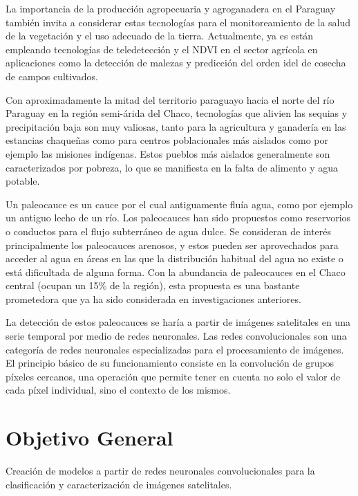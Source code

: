 \documentclass[a4paper, 11pt]{article}
\begin{document}
La importancia de la producción agropecuaria y agroganadera en el Paraguay también invita a considerar estas tecnologías para el monitoreamiento de la salud de la vegetación y el uso adecuado de la tierra. Actualmente, ya es están empleando tecnologías de teledetección y el NDVI en el sector agrícola en aplicaciones como la detección de malezas y predicción del orden idel de cosecha de campos cultivados. \autocite{onesoil-agricultura-paraguay}

Con aproximadamente la mitad del territorio paraguayo hacia el norte del río Paraguay en la región semi-árida del Chaco, tecnologías que alivien las sequias y precipitación baja son muy valiosas, tanto para la agricultura y ganadería en las estancias chaqueñas como para centros poblacionales más aislados como por ejemplo las misiones indígenas. Estos pueblos más aislados generalmente son caracterizados por pobreza, lo que se manifiesta en la falta de alimento y agua potable.

Un paleocauce es un cauce por el cual antiguamente fluía agua, como por ejemplo un antiguo lecho de un río. Los paleocauces han sido propuestos como reservorios o conductos para el flujo subterráneo de agua dulce. Se consideran de interés principalmente los paleocauces arenosos, y estos pueden ser aprovechados para acceder al agua en áreas en las que la distribución habitual del agua no existe o está dificultada de alguna forma. \autocite{wikipedia-paleochannel} Con la abundancia de paleocauces en el Chaco central (ocupan un 15\% de la región), esta propuesta es una bastante prometedora que ya ha sido considerada en investigaciones anteriores. \autocite{conacyt-sistemas-captacion-agua}

La detección de estos paleocauces se haría a partir de imágenes satelitales en una serie temporal por medio de redes neuronales. Las redes convolucionales son una categoría de redes neuronales especializadas para el procesamiento de imágenes. El principio básico de su funcionamiento consiste en la convolución de grupos píxeles cercanos, una operación que permite tener en cuenta no solo el valor de cada píxel individual, sino el contexto de los mismos. \autocite{axiv-cnn-satellite-imaging}

\section*{Objetivo General}
Creación de modelos a partir de redes neuronales convolucionales para la clasificación y caracterización de imágenes satelitales.
\end{document}
